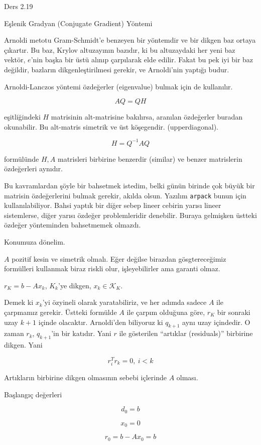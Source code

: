 \documentclass[12pt,fleqn]{article}\usepackage{../../common}
\begin{document}
Ders 2.19

Eşlenik Gradyan (Conjugate Gradient) Yöntemi 

Arnoldi metotu Gram-Schmidt'e benzeyen bir yöntemdir ve bir dikgen baz
ortaya çıkartır. Bu baz, Krylov altuzayının bazıdır, ki bu altuzaydaki her
yeni baz vektör, $e$'nin başka bir üstü alınıp çarpılarak elde
edilir. Fakat bu pek iyi bir baz değildir, bazların dikgenleştirilmesi
gerekir, ve Arnoldi'nin yaptığı budur.

Arnoldi-Lanczos yöntemi özdeğerler (eigenvalue) bulmak için de kullanılır.

$$ AQ = QH $$

eşitliğindeki $H$ matrisinin alt-matrisine bakılırsa, aranılan özdeğerler
buradan okunabilir. Bu alt-matris simetrik ve üst köşegendir.
(upperdiagonal). 

$$ H = Q^{-1}AQ $$

formülünde $H,A$ matrisleri birbirine benzerdir (similar) ve benzer
matrislerin özdeğerleri aynıdır. 

Bu kavramlardan şöyle bir bahsetmek istedim, belki günün birinde çok büyük
bir matrisin özdeğerlerini bulmak gerekir, akılda olsun. Yazılım
\verb!arpack! bunun için kullanılabiliyor. Bahsi yaptık bir diğer sebep
lineer cebirin yarısı lineer sistemlerse, diğer yarısı özdeğer
problemleridir denebilir. Buraya gelmişken üstteki özdeğer yönteminden
bahsetmemek olmazdı.

Konumuza dönelim. 

$A$ pozitif kesin ve simetrik olmalı. Eğer değilse birazdan gösgtereceğimiz
formülleri kullanmak biraz riskli olur, işleyebilirler ama garanti olmaz. 

$r_K = b - Ax_k $, $K_k$'ye dikgen, $x_k \in \mathscr{K}_K$. 

Demek ki $x_k$'yi özyineli olarak yaratabiliriz, ve her adımda sadece $A$ ile
çarpmamız gerekir. Üstteki formülde $A$ ile çarpım olduğuna göre, $r_K$ bir
sonraki uzay $k+1$ içinde olacaktır. Arnoldi'den biliyoruz ki $q_{k+1}$ aynı
uzay içindedir. O zaman $r_k$, $q_{k+1}$'in bir katıdır. Yani $r$ ile gösterilen
``artıklar (residuals)'' birbirine dikgen. Yani

$$ r_i^Tr_k = 0, \ i < k $$

Artıkların birbirine dikgen olmasının sebebi içlerinde $A$ olması. 

Başlangıç değerleri

$$ d_0 = b $$

$$ x_0 = 0 $$

$$ r_0 = b - Ax_0  = b$$
\end{document}
